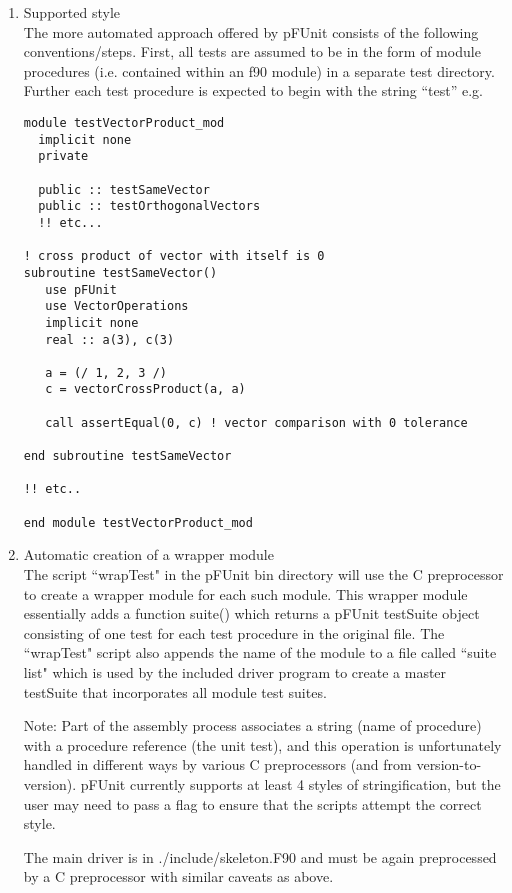 \documentclass[10pt]{article}
\newcommand{\pfunit}{{\sc pFUnit }}
\begin{document}
\begin{enumerate}
\item Supported style\\
The more automated approach offered by \pfunit consists of the
following conventions/steps.  First, all tests are assumed to be in
the form of module procedures (i.e. contained within an f90 module) in
a separate test directory.  Further each test procedure is expected to
begin with the string ``test'' e.g.

\begin{verbatim}
module testVectorProduct_mod
  implicit none
  private

  public :: testSameVector
  public :: testOrthogonalVectors
  !! etc...

! cross product of vector with itself is 0
subroutine testSameVector()
   use pFUnit
   use VectorOperations
   implicit none
   real :: a(3), c(3)

   a = (/ 1, 2, 3 /)
   c = vectorCrossProduct(a, a)
   
   call assertEqual(0, c) ! vector comparison with 0 tolerance
   
end subroutine testSameVector

!! etc..

end module testVectorProduct_mod

\end{verbatim}

\item Automatic creation of a wrapper module\\
The script ``wrapTest" in the \pfunit bin directory will use the C
preprocessor to create a wrapper module for each such module.  This
wrapper module essentially adds a function suite() which returns a
\pfunit testSuite object consisting of one test for each test
procedure in the original file.  The ``wrapTest" script also appends
the name of the module to a file called ``suite\underline{ }list" which is used
by the included driver program to create a master testSuite that
incorporates all module test suites.

Note: Part of the assembly process associates a string (name of
procedure) with a procedure reference (the unit test), and this
operation is unfortunately handled in different ways by various C
preprocessors (and from version-to-version).  \pfunit currently
supports at least 4 styles of stringification, but the user may need
to pass a flag to ensure that the scripts attempt the correct style.

The main driver is in ./include/skeleton.F90 and must be again
preprocessed by a C preprocessor with similar caveats as above.


\end{enumerate}
\end{document}
